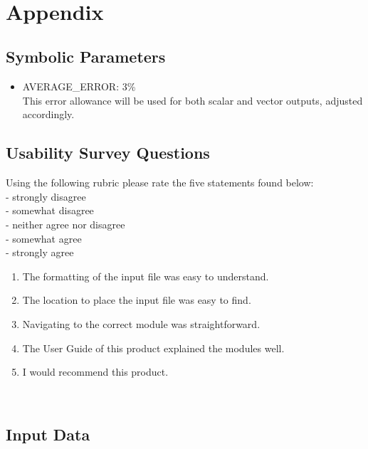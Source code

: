 \documentclass[12pt, titlepage]{article}
\begin{document}
~\newpage


\section{Appendix}


\subsection{Symbolic Parameters}
\label{symbolpara}
\begin{itemize}

\item[\label{Cons_AVERAGE_ERROR}]AVERAGE\_ERROR: 3\%\\This error allowance will
  be used for both scalar and vector outputs, adjusted accordingly.

\end{itemize}

\subsection{Usability Survey Questions}
\label{usabilitysurevyquestions}
Using the following rubric please rate the five statements found below:\\
\linebreak
{} - strongly disagree\\
 - somewhat disagree\\
 - neither agree nor disagree\\
 - somewhat agree\\
 - strongly agree\\

\begin{enumerate}
\item The formatting of the input file was easy to understand.
\item The location to place the input file was easy to find.
\item Navigating to the correct module was straightforward.
\item The User Guide of this product explained the modules well.
\item I would recommend this product.
\end{enumerate}

~\newpage
\subsection{Input Data}
\label{inputdata}
\end{document}

